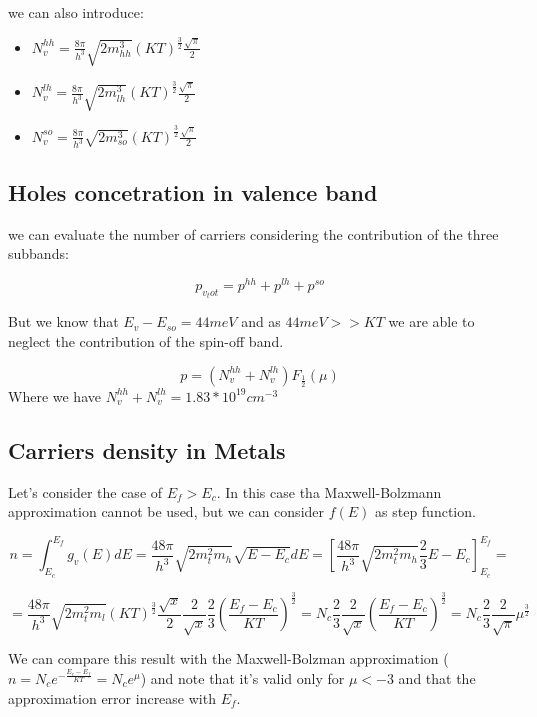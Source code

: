 	we can also introduce:

	\begin{itemize}
		\item $N_v^{hh}=\frac{8 \pi}{h^3}\sqrt{2m_{hh}^3}(KT)^{\frac{3}{2}}\frac{\sqrt{\pi}}{2}$
		\item $N_v^{lh}=\frac{8 \pi}{h^3}\sqrt{2m_{lh}^3}(KT)^{\frac{3}{2}}\frac{\sqrt{\pi}}{2}$
		\item $N_v^{so}=\frac{8 \pi}{h^3}\sqrt{2m_{so}^3}(KT)^{\frac{3}{2}}\frac{\sqrt{\pi}}{2}$
	\end{itemize}

	\subsection{Holes concetration in valence band}
		we can evaluate the number of carriers considering the contribution of the three subbands:

		\begin{equation}
			p_{v_tot}=p^{hh}+p^{lh}+p^{so}
		\end{equation}

		But we know that $E_v-E_{so}=44meV$ and as $44meV>>KT$ we are able to neglect the contribution of the spin-off band.

		\begin{equation}
			p=(N_v^{hh}+N_v^{lh})F_{\frac{1}{2}}(\mu)
		\end{equation}
		Where we have $N_v^{hh}+N_v^{lh}=1.83*10^19 cm^{-3}$


	\subsection{Carriers density in Metals}
		Let's consider the case of $E_f>E_c$.
		In this case tha Maxwell-Bolzmann approximation cannot be used, but we can consider $f(E)$ as step function.

		\[n=\int_{E_c}^{E_f}g_v(E)dE=\frac{48 \pi}{h^3}\sqrt{2m_t^2m_h}\sqrt{E-E_c}dE=\left[ \frac{48 \pi}{h^3}\sqrt{2m_t^2m_h}\frac{2}{3}{E-E_c} \right]_{E_c}^{E_f}=\]
		 
		 \begin{equation}
		 = \frac{48 \pi}{h^3}\sqrt{2m_t^2m_l}(KT)^{\frac{3}{2}} \frac{\sqrt{x}}{2}	\frac{2}{\sqrt{x}} \frac{2}{3} \left(\frac{E_f-E_c}{KT}\right)^ {\frac{3}{2}} = N_c \frac{2}{3}  \frac{2}{\sqrt{x}} \left(\frac { E_f-E_c}{KT}\right)^{ \frac{3}{2} }=N_c\frac{2}{3} \frac{2}{\sqrt{\pi}} \mu^{\frac{3}{2}} 
		 \end{equation}
		
		We can compare this result with the Maxwell-Bolzman approximation ($n=N_ce^{-\frac{E_c-E_f}{KT}}=N_ce^{\mu}$) and note that it's valid only for $\mu<-3$ and that the approximation error increase with $E_f$.
